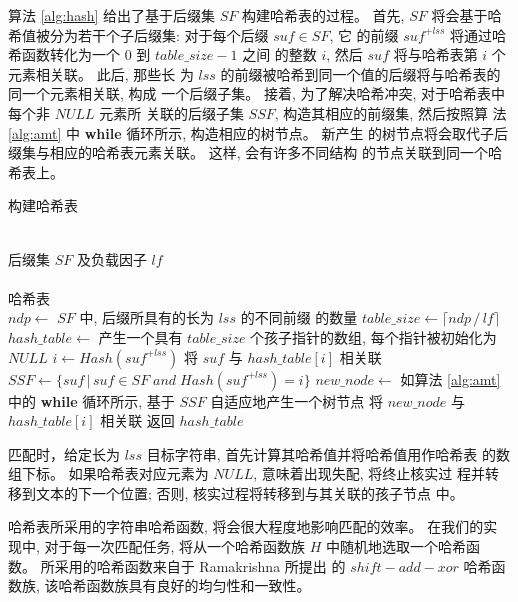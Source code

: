 算法 \ref{alg:hash} 给出了基于后缀集 $SF$ 构建哈希表的过程。  首先,
$SF$ 将会基于哈希值被分为若干个子后缀集: 对于每个后缀 $suf \in SF$, 它
的前缀 $suf^{+lss}$ 将通过哈希函数转化为一个 0 到 $table\_size-1$ 之间
的整数 $i$, 然后 $suf$ 将与哈希表第 $i$ 个元素相关联。 此后, 那些长
为 $lss$ 的前缀被哈希到同一个值的后缀将与哈希表的同一个元素相关联, 构成
一个后缀子集。 接着, 为了解决哈希冲突, 对于哈希表中每个非 $NULL$ 元素所
关联的后缀子集 $SSF$, 构造其相应的前缀集, 然后按照算
法 \ref{alg:amt} 中 \textbf{while} 循环所示, 构造相应的树节点。 新产生
的树节点将会取代子后缀集与相应的哈希表元素关联。 这样, 会有许多不同结构
的节点关联到同一个哈希表上。

\begin{algorithm}
  \caption{构建哈希表}
  \label{alg:hash}
  \begin{algorithmic}[1]
    \REQUIRE ~~\\
    后缀集 $SF$ 及负载因子 $lf$ \\
    \ENSURE ~~\\
    哈希表\\
    \STATE
    \STATE $ndp \leftarrow$ $SF$ 中, 后缀所具有的长为 $lss$ 的不同前缀
    的数量
    \STATE $table\_size \leftarrow \lceil ndp\,/\,lf \rceil$
    \STATE $hash\_table \leftarrow$ 产生一个具有
    $table\_size$ 个孩子指针的数组, 每个指针被初始化为 $NULL$
    \STATE
    \STATE $i \leftarrow Hash(suf^{+lss})$
    \STATE 将 $suf$ 与 $hash\_table[i]$ 相关联
    \ENDFOR
    \STATE
    \STATE $SSF \leftarrow \{suf\,|\,suf\in SF\; and\; Hash(suf^{+lss})=i\}$
    \STATE $new\_node \leftarrow$ 如算法 \ref{alg:amt} 中的
    \textbf{while} 循环所示, 基于 $SSF$ 自适应地产生一个树节点
    \STATE 将 $new\_node$ 与 $hash\_table[i]$ 相关联
    \ENDIF
    \ENDFOR
    \STATE
    \STATE 返回 $hash\_table$
  \end{algorithmic}
\end{algorithm}

匹配时，给定长为 $lss$ 目标字符串, 首先计算其哈希值并将哈希值用作哈希表
的数组下标。 如果哈希表对应元素为 $NULL$, 意味着出现失配, 将终止核实过
程并转移到文本的下一个位置; 否则, 核实过程将转移到与其关联的孩子节点
中。

哈希表所采用的字符串哈希函数, 将会很大程度地影响匹配的效率。 在我们的实
现中, 对于每一次匹配任务, 将从一个哈希函数族 $H$ 中随机地选取一个哈希函
数。 所采用的哈希函数来自于 Ramakrishna \cite{Ramakrishna1997} 所提出
的 $shift-add-xor$ 哈希函数族, 该哈希函数族具有良好的均匀性和一致性。

